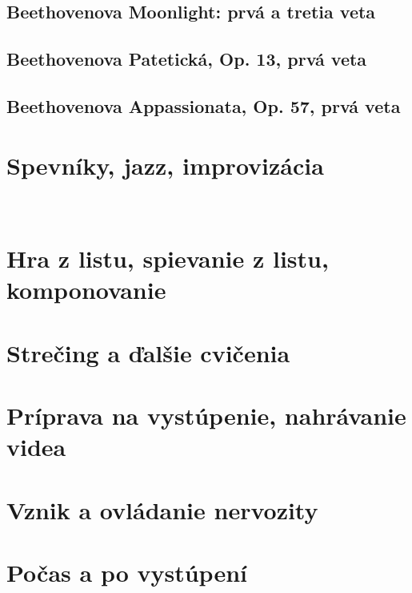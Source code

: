 \documentclass[11pt,a4paper]{book}
\begin{document}
\subsection{Beethovenova Moonlight: prvá a tretia veta}\label{s:beethoven-moonlight}

\subsection{Beethovenova Patetická, Op. 13, prvá veta}\label{s:beethoven-patetique}

\subsection{Beethovenova Appassionata, Op. 57, prvá veta}\label{s:beethoven-apassionata}

\section{Spevníky, jazz, improvizácia}\label{s:fake-books}
\ 
\section{Hra z listu, spievanie z listu, komponovanie}\label{s:sight-reading}

\section{Strečing a ďalšie cvičenia}\label{s:stretching}

\section{Príprava na vystúpenie, nahrávanie videa}\label{s:performance-preparation}

\section{Vznik a ovládanie nervozity}\label{s:origin-nervousness}

\section{Počas a po vystúpení}\label{s:during-performance}

\newpage
\end{document}
